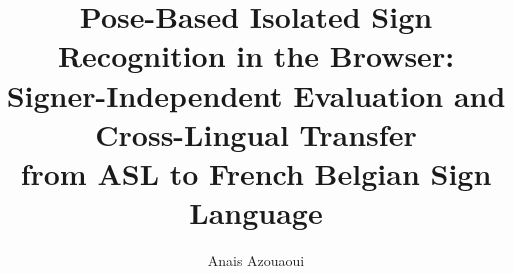 \documentclass[11pt,a4paper]{article}
\title{\textbf{Pose-Based Isolated Sign Recognition in the Browser:\\
Signer-Independent Evaluation and Cross-Lingual Transfer\\ from ASL to French Belgian Sign Language}}
\author{Anais Azouaoui}
\date{}
\begin{document}
\maketitle

\begin{abstract}

\end{abstract}













\appendix

\end{document}
